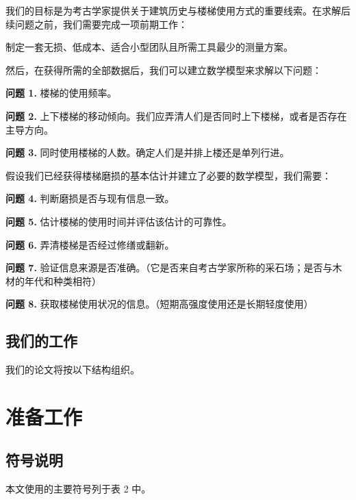 \documentclass[11pt,a4paper]{ctexart}
\begin{document}
我们的目标是为考古学家提供关于建筑历史与楼梯使用方式的重要线索。在求解后续问题之前，我们需要完成一项前期工作：

制定一套无损、低成本、适合小型团队且所需工具最少的测量方案。

然后，在获得所需的全部数据后，我们可以建立数学模型来求解以下问题：

\textbf{问题 1.} 楼梯的使用频率。

\textbf{问题 2.} 上下楼梯的移动倾向。我们应弄清人们是否同时上下楼梯，或者是否存在主导方向。

\textbf{问题 3.} 同时使用楼梯的人数。确定人们是并排上楼还是单列行进。

假设我们已经获得楼梯磨损的基本估计并建立了必要的数学模型，我们需要：

\textbf{问题 4.} 判断磨损是否与现有信息一致。

\textbf{问题 5.} 估计楼梯的使用时间并评估该估计的可靠性。

\textbf{问题 6.} 弄清楼梯是否经过修缮或翻新。

\textbf{问题 7.} 验证信息来源是否准确。（它是否来自考古学家所称的采石场；是否与木材的年代和种类相符）

\textbf{问题 8.} 获取楼梯使用状况的信息。（短期高强度使用还是长期轻度使用）

\subsection{我们的工作}

我们的论文将按以下结构组织。

\section{准备工作}

\subsection{符号说明}

本文使用的主要符号列于表 2 中。
\end{document}

